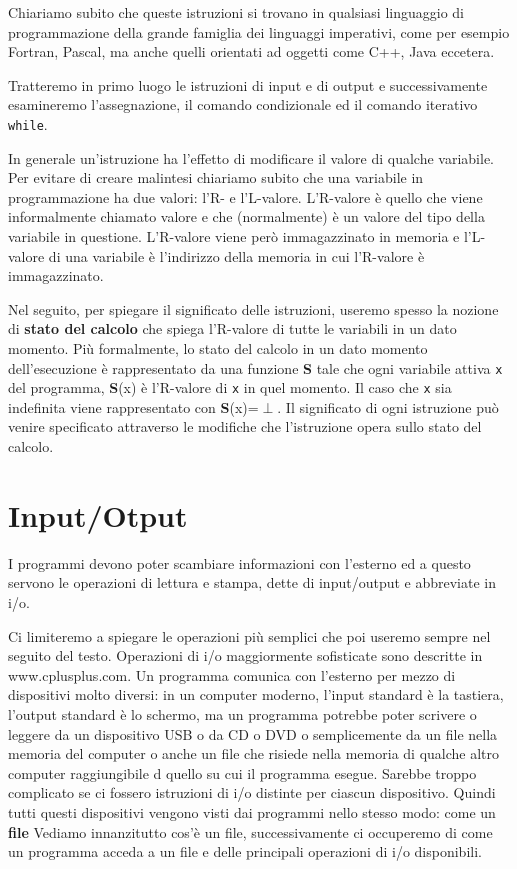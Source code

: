 \noindent Chiariamo subito che queste istruzioni si trovano in qualsiasi linguaggio di programmazione della grande famiglia dei linguaggi imperativi, come per esempio Fortran, Pascal, ma anche quelli orientati ad oggetti come C++, Java eccetera.

\noindent Tratteremo in primo luogo le istruzioni di input e di output e successivamente esamineremo l'assegnazione, il comando condizionale ed il comando iterativo \texttt{while}.

In generale un'istruzione ha l'effetto di modificare il valore di qualche variabile.
Per evitare di creare malintesi chiariamo subito che una variabile in programmazione ha due valori: l'R- e l'L-valore.
L'R-valore è quello che viene informalmente chiamato valore e che (normalmente) è un valore del tipo della variabile in questione.
L'R-valore viene però immagazzinato in memoria e l'L-valore di una variabile è l'indirizzo della memoria in cui l'R-valore è immagazzinato.

Nel seguito, per spiegare il significato delle istruzioni, useremo spesso la nozione di \textbf{stato del calcolo} che spiega l'R-valore di tutte le variabili in un dato momento.
Più formalmente, lo stato del calcolo in un dato momento dell'esecuzione è rappresentato da una funzione \textbf{S} tale che ogni variabile attiva \texttt{x} del programma, \textbf{S}(x) è l'R-valore di \texttt{x} in quel momento.
Il caso che \texttt{x} sia indefinita viene rappresentato con \textbf{S}(x)=$\perp$.
Il significato di ogni istruzione può venire specificato attraverso le modifiche che l'istruzione opera sullo stato del calcolo.

\section{Input/Otput}
I programmi devono poter scambiare informazioni con l'esterno ed a questo servono le operazioni di lettura e stampa, dette di input/output e abbreviate in i/o.

\noindent Ci limiteremo a spiegare le operazioni più semplici che poi useremo sempre nel seguito del testo.
Operazioni di i/o maggiormente sofisticate sono descritte in www.cplusplus.com.
Un programma comunica con l'esterno per mezzo di dispositivi molto diversi: in un computer moderno, l'input standard è la tastiera, l'output standard è lo schermo, ma un programma potrebbe poter scrivere o leggere da un dispositivo USB o da CD o DVD o semplicemente da un file nella memoria del computer o anche un file che risiede nella memoria di qualche altro computer raggiungibile d quello su cui il programma esegue.
Sarebbe troppo complicato se ci fossero istruzioni di i/o distinte per ciascun dispositivo.
Quindi tutti questi dispositivi vengono visti dai programmi nello stesso modo: come un \textbf{file}
Vediamo innanzitutto cos'è un file, successivamente ci occuperemo di come un programma acceda a un file e delle principali operazioni di i/o disponibili.

